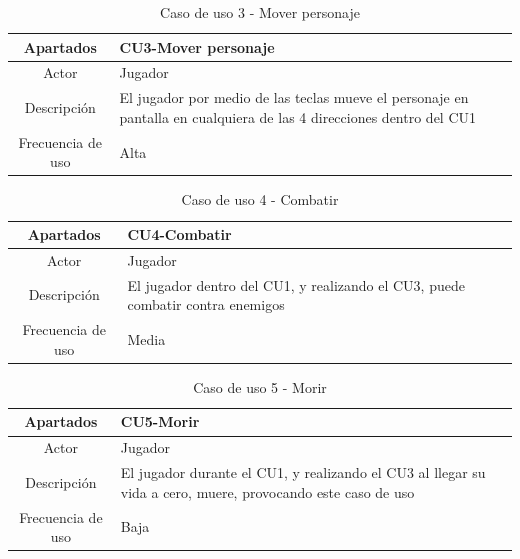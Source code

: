 \documentclass[a4paper]{article}
\begin{document}
\begin{table}[!ht]
    \centering
    \begin{tabular}{|c|p{12cm}|} 
        \hline
        \textbf{Apartados}       & \textbf{CU3-Mover personaje} \\
        \hline
        Actor                    & Jugador \\
        \hline
        Descripción              & El jugador por medio de las teclas mueve el personaje en pantalla en cualquiera de las 4 direcciones dentro del CU1 \\
        \hline
        Frecuencia de uso        & Alta \\
        \hline
    \end{tabular}
    \caption{Caso de uso 3 - Mover personaje}
    \label{tab:casosdeuso3-table}
\end{table}

\begin{table}[!ht]
    \centering
    \begin{tabular}{|c|p{12cm}|} 
        \hline
        \textbf{Apartados}       & \textbf{CU4-Combatir} \\
        \hline
        Actor                    & Jugador \\
        \hline
        Descripción              & El jugador dentro del CU1, y realizando el CU3, puede combatir contra enemigos \\
        \hline
        Frecuencia de uso        & Media \\
        \hline
    \end{tabular}
    \caption{Caso de uso 4 - Combatir}
    \label{tab:casosdeuso4-table}
\end{table}

\begin{table}[!ht]
    \centering
    \begin{tabular}{|c|p{12cm}|} 
        \hline
        \textbf{Apartados}       & \textbf{CU5-Morir} \\
        \hline
        Actor                    & Jugador \\
        \hline
        Descripción              & El jugador durante el CU1, y realizando el CU3 al llegar su vida a cero, muere, provocando este caso de uso \\
        \hline
        Frecuencia de uso        & Baja \\
        \hline
    \end{tabular}
    \caption{Caso de uso 5 - Morir}
    \label{tab:casosdeuso5-table}
\end{table}
\end{document}
